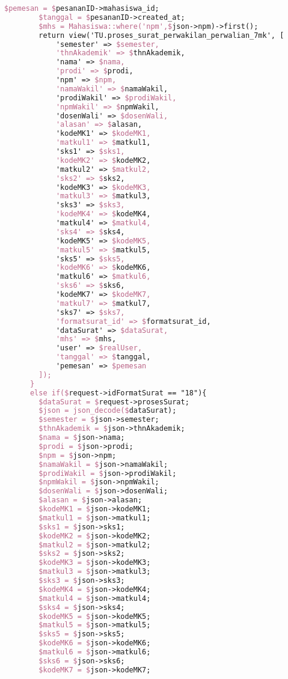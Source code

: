 \begin{lstlisting}[language=tex,basicstyle=\tiny,caption=PesanansuratController.php]
        $pemesan = $pesananID->mahasiswa_id;
        $tanggal = $pesananID->created_at;
        $mhs = Mahasiswa::where('npm',$json->npm)->first();
        return view('TU.proses_surat_perwakilan_perwalian_7mk', [
            'semester' => $semester,
            'thnAkademik' => $thnAkademik,
            'nama' => $nama,
            'prodi' => $prodi,
            'npm' => $npm,
            'namaWakil' => $namaWakil,
            'prodiWakil' => $prodiWakil,
            'npmWakil' => $npmWakil,
            'dosenWali' => $dosenWali,
            'alasan' => $alasan,
            'kodeMK1' => $kodeMK1,
            'matkul1' => $matkul1,
            'sks1' => $sks1,
            'kodeMK2' => $kodeMK2,
            'matkul2' => $matkul2,
            'sks2' => $sks2,
            'kodeMK3' => $kodeMK3,
            'matkul3' => $matkul3,
            'sks3' => $sks3,
            'kodeMK4' => $kodeMK4,
            'matkul4' => $matkul4,
            'sks4' => $sks4,
            'kodeMK5' => $kodeMK5,
            'matkul5' => $matkul5,
            'sks5' => $sks5,
            'kodeMK6' => $kodeMK6,
            'matkul6' => $matkul6,
            'sks6' => $sks6,
            'kodeMK7' => $kodeMK7,
            'matkul7' => $matkul7,
            'sks7' => $sks7,
            'formatsurat_id' => $formatsurat_id,
            'dataSurat' => $dataSurat,
            'mhs' => $mhs,
            'user' => $realUser,
            'tanggal' => $tanggal,
            'pemesan' => $pemesan
        ]);
      }
      else if($request->idFormatSurat == "18"){
        $dataSurat = $request->prosesSurat;
        $json = json_decode($dataSurat);
        $semester = $json->semester;
        $thnAkademik = $json->thnAkademik;
        $nama = $json->nama;
        $prodi = $json->prodi;
        $npm = $json->npm;
        $namaWakil = $json->namaWakil;
        $prodiWakil = $json->prodiWakil;
        $npmWakil = $json->npmWakil;
        $dosenWali = $json->dosenWali;
        $alasan = $json->alasan;
        $kodeMK1 = $json->kodeMK1;
        $matkul1 = $json->matkul1;
        $sks1 = $json->sks1;
        $kodeMK2 = $json->kodeMK2;
        $matkul2 = $json->matkul2;
        $sks2 = $json->sks2;
        $kodeMK3 = $json->kodeMK3;
        $matkul3 = $json->matkul3;
        $sks3 = $json->sks3;
        $kodeMK4 = $json->kodeMK4;
        $matkul4 = $json->matkul4;
        $sks4 = $json->sks4;
        $kodeMK5 = $json->kodeMK5;
        $matkul5 = $json->matkul5;
        $sks5 = $json->sks5;
        $kodeMK6 = $json->kodeMK6;
        $matkul6 = $json->matkul6;
        $sks6 = $json->sks6;
        $kodeMK7 = $json->kodeMK7;

\end{lstlisting}
